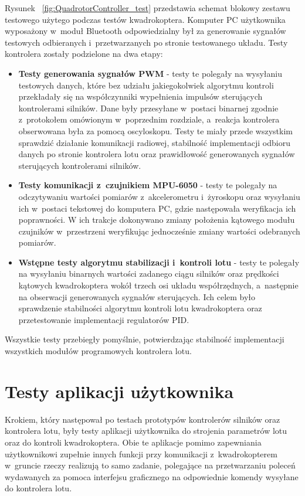 Rysunek ~\ref{fig:QuadrotorController_test} przedstawia schemat blokowy zestawu testowego użytego podczas testów kwadrokoptera. Komputer PC użytkownika wyposażony w~moduł Bluetooth odpowiedzialny był za generowanie sygnałów testowych odbieranych i~przetwarzanych po stronie testowanego układu. Testy kontrolera zostały podzielone na dwa etapy:
\begin{itemize}
	\item \textbf{Testy generowania sygnałów PWM} - testy te polegały na wysyłaniu testowych danych, które bez udziału jakiegokolwiek algorytmu kontroli przekładały się na współczynniki wypełnienia impulsów sterujących kontrolerami silników. Dane były przesyłane w~postaci binarnej zgodnie z~protokołem omówionym w~poprzednim rozdziale, a~reakcja kontrolera obserwowana była za pomocą oscyloskopu. Testy te miały przede wszystkim sprawdzić działanie komunikacji radiowej, stabilność implementacji odbioru danych po stronie kontrolera lotu oraz prawidłowość generowanych sygnałów sterujących kontrolerami silników.
	\item \textbf{Testy komunikacji z~czujnikiem MPU-6050} - testy te polegały na odczytywaniu wartości pomiarów z~akcelerometru i~żyroskopu oraz wysyłaniu ich w~postaci tekstowej do komputera PC, gdzie następowała weryfikacja ich poprawności. W ich trakcje dokonywano zmiany położenia kątowego modułu czujników w~przestrzeni weryfikując jednocześnie zmiany wartości odebranych pomiarów.  
	\item \textbf{Wstępne testy algorytmu stabilizacji i~kontroli lotu} - testy te polegały na wysyłaniu binarnych wartości zadanego ciągu silników oraz prędkości kątowych kwadrokoptera wokół trzech osi układu współrzędnych, a~następnie na obserwacji generowanych sygnałów sterujących. Ich celem było sprawdzenie stabilności algorytmu kontroli lotu kwadrokoptera oraz przetestowanie implementacji regulatorów PID.   
\end{itemize}

Wszystkie testy przebiegły pomyślnie, potwierdzając stabilność implementacji wszystkich modułów programowych kontrolera lotu.

\section{Testy aplikacji użytkownika}

Krokiem, który następował po testach prototypów kontrolerów silników oraz kontrolera lotu, były testy aplikacji użytkownika do strojenia parametrów lotu oraz do kontroli kwadrokoptera. Obie te aplikacje pomimo zapewniania użytkownikowi zupełnie innych funkcji przy komunikacji z~kwadrokopterem w~gruncie rzeczy realizują to samo zadanie, polegające na przetwarzaniu poleceń wydawanych za pomoca interfejsu graficznego na odpowiednie komendy wysyłane do kontrolera lotu. 

